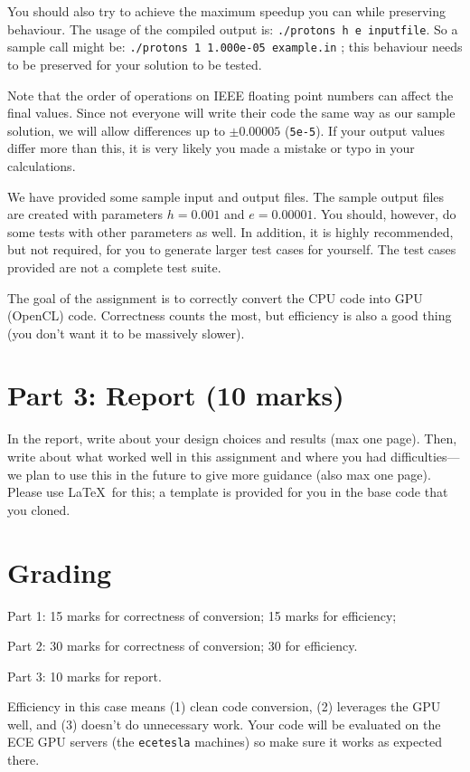 \documentclass[letterpaper,10pt]{article}
\begin{document}
You should also try to achieve the maximum speedup you can while preserving behaviour. The usage of the compiled output is: \texttt{./protons h e inputfile}. So a sample call might be: \texttt{./protons 1 1.000e-05 example.in} ; this behaviour needs to be preserved for your solution to be tested.

Note that the order of operations on IEEE floating point numbers can affect the final values. Since not everyone will write their code the same way as our sample solution, we will allow differences up to $\pm 0.00005$ (\texttt{5e-5}). If your output values differ more than this, it is very likely you made a mistake or typo in your calculations.

We have provided some sample input and output files. The sample output files are created with parameters $h=0.001$ and $e=0.00001$. You should, however, do some tests with other parameters as well. In addition, it is highly recommended, but not required, for you to generate larger test cases for yourself. The test cases provided are not a complete test suite.

The goal of the assignment is to correctly convert the CPU code into GPU (OpenCL) code. Correctness counts the most, but efficiency is also a good thing (you don't want it to be massively slower). 

\section*{Part 3: Report (10 marks)}
In the report, write about your design choices and results (max one page).  
Then, write about what worked well in this assignment and where you had difficulties---we plan to use this in the future to give more guidance (also max one page). Please use \LaTeX~for this; a template is provided for you in the base code that you cloned. 

\section*{Grading}
Part 1: 15 marks for correctness of conversion; 15 marks for efficiency; 

Part 2: 30 marks for correctness of conversion; 30 for efficiency.

Part 3: 10 marks for report.

Efficiency in this case means (1) clean code conversion, (2) leverages the GPU well, and (3) doesn't do unnecessary work. Your code will be evaluated on the ECE GPU servers (the \texttt{ecetesla} machines) so make sure it works as expected there. 
\end{document}
